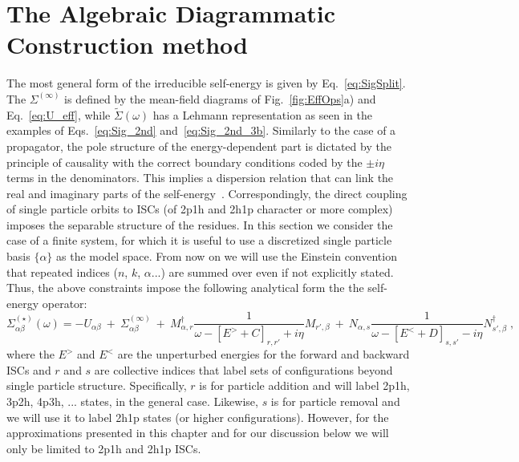 \section{The Algebraic Diagrammatic Construction method}
\label{sec:scgf_adc}

The most general form of the irreducible self-energy is given by Eq.~\eqref{eq:SigSplit}. The $\Sigma^{(\infty)}$  is defined by the mean-field diagrams of Fig.~\ref{fig:EffOps}a) and Eq.~\eqref{eq:U_eff}, while $\widetilde\Sigma(\omega)$ has a Lehmann representation as seen in the examples of Eqs.~\eqref{eq:Sig_2nd} and~\eqref{eq:Sig_2nd_3b}. Similarly to the case of a propagator, the  pole structure of the energy-dependent part is dictated by the principle of causality with the correct boundary conditions coded by the  $\pm i\eta$ terms in the denominators.  This implies a dispersion relation that  can link the real and imaginary parts of the self-energy~\cite{ch11_MahauxSartor91,ch11_Dickhoff2008}.  Correspondingly, the direct coupling of single particle orbits to  ISCs (of 2p1h and 2h1p character or more complex) imposes  the separable structure of the residues. In this section we consider the case of a  finite system, for which it is useful to use a discretized single particle basis $\{\alpha\}$ as the model space. 
%
From now on we will use the Einstein convention that repeated indices ($n$, $k$, $\alpha$...) are summed over even if not explicitly stated.
%
Thus, the above constraints impose the following  analytical form the the self-energy operator:
\begin{equation}
\Sigma^{(\star)}_{\alpha\beta}(\omega) =  - U_{\alpha \beta}  ~+~ \Sigma^{(\infty)}_{\alpha\beta} ~+~ M^\dagger_{\alpha, r}\frac1{\omega - [E^> +C]_{r,r'} + i \eta}M_{r', \beta} 
       ~+~ N_{\alpha, s}\frac1{\omega - [E^< +D]_{s,s'} - i \eta}N^\dagger_{s', \beta}  \; ,
\label{eq:ADC_SE_form}
\end{equation}
where the $E^>$ and $E^<$ are the unperturbed energies for the forward and backward ISCs and $r$ and $s$ are collective indices that label sets of configurations beyond single particle structure. Specifically, $r$ is for particle addition and will label 2p1h, 3p2h, 4p3h, ... states, in the general case. Likewise, $s$ is for particle removal and we will use it to label 2h1p states (or higher configurations). However, for the approximations presented in this chapter and for our discussion below we will only be limited to 2p1h and 2h1p ISCs.

